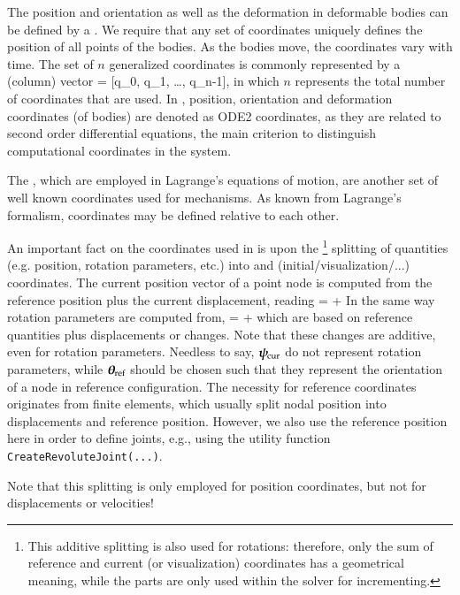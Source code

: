 The position and orientation as well as the deformation in deformable bodies can be defined by a . We require that any set of coordinates uniquely defines the position of all points of the bodies.
As the bodies move, the coordinates vary with time.
The set of $n$ generalized coordinates is commonly represented by a (column) vector
\be
  \qv = [q_0, q_1, \ldots, q_{n-1}]\tp,
\ee
in which $n$ represents the total number of coordinates that are used. 
In \codeName, position, orientation and deformation coordinates (of bodies) are denoted as \ac{ODE2} coordinates, as they are related to second order differential equations, the main criterion to distinguish computational coordinates in the system.

The , which are employed in Lagrange's equations of motion, are another set of well known coordinates used for mechanisms. As known from Lagrange's formalism, coordinates may be defined relative to each other.

%
An important fact on the coordinates used in \codeName is upon the \footnote{This additive splitting is also used for rotations: therefore, only the sum of reference and current (or visualization) coordinates has a geometrical meaning, while the parts are only used within the solver for incrementing.} splitting of quantities (e.g. position, rotation parameters, etc.) into  and  (initial/visualization/...) coordinates.
The current position vector of a point node is computed from the reference position plus the current displacement, reading
\be
  \pv\cCur = \pv\cRef + \uv\cCur
\ee
In the same way rotation parameters are computed from,
\be
  \ttheta\cCur = \ttheta\cRef + \tpsi\cCur
\ee
which are based on reference quantities plus displacements or changes. Note that these changes are additive, even for rotation parameters. Needless to say, $\mbox{\boldmath $\psi$ \unboldmath}\!\!_\mathrm{cur}$ do not represent rotation parameters, while $\mbox{\boldmath $\theta$ \unboldmath}\!\!_\mathrm{ref}$ should be chosen such that they represent the orientation of a node in reference configuration.
The necessity for reference coordinates originates from finite elements, which usually split nodal position into displacements and reference position.
However, we also use the reference position here in order to define joints, e.g., using the utility function \texttt{CreateRevoluteJoint(...)}.

Note that this splitting is only employed for position coordinates, but not for displacements or velocities!

